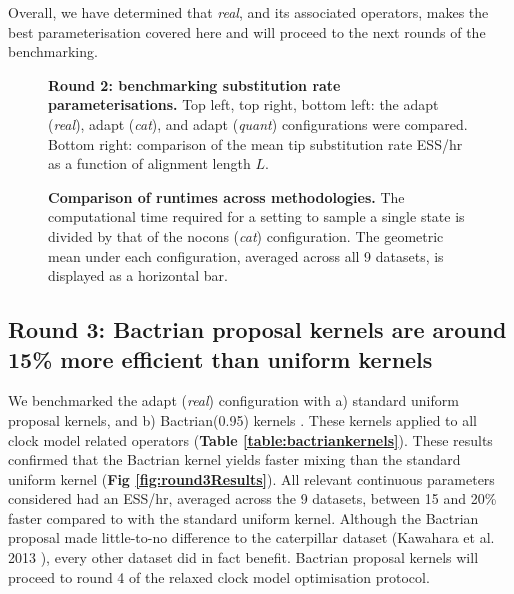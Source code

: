 \documentclass[10pt,letterpaper]{article}
\begin{document}
Overall, we have determined that \textit{real}, and its associated operators, makes the best parameterisation covered here and will proceed to the next rounds of the benchmarking.



\begin{figure}[!h]
\caption{\textbf{Round 2: benchmarking substitution rate parameterisations.} Top left, top right, bottom left: the adapt (\textit{real}), adapt (\textit{cat}), and adapt (\textit{quant}) configurations were compared. Bottom right: comparison of the mean tip substitution rate ESS/hr as a function of alignment length $L$. }
\label{fig:round2Results}
\end{figure}




\begin{figure}[!h]
\caption{\textbf{Comparison of runtimes across methodologies.} 
The computational time required for a setting to sample a single state is divided by that of the nocons (\textit{cat}) configuration.
The geometric mean under each configuration, averaged across all 9 datasets, is displayed as a horizontal bar.}
\label{fig:round2Resultsb}
\end{figure}







\subsection*{Round 3: Bactrian proposal kernels are around 15\% more efficient than uniform kernels}


We benchmarked the adapt (\textit{real}) configuration with a) standard uniform proposal kernels, and b) Bactrian(0.95) kernels \cite{yang2013searching}.
These kernels applied to all clock model related operators (\textbf{Table \ref{table:bactriankernels}}).
These results confirmed that the Bactrian kernel yields faster mixing than the standard uniform kernel (\textbf{Fig \ref{fig:round3Results}}).
All relevant continuous parameters considered had an ESS/hr, averaged across the 9 datasets, between 15 and 20\% faster compared to with the standard uniform kernel.
Although the Bactrian proposal made little-to-no difference to the caterpillar dataset (Kawahara et al. 2013 \cite{Kawahara_2013}), every other dataset did in fact benefit.
Bactrian proposal kernels will proceed to round 4 of the relaxed clock model optimisation protocol. 
\end{document}
